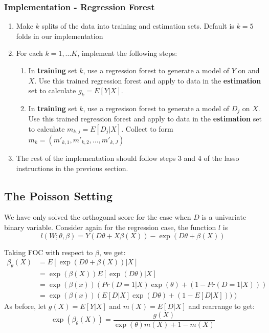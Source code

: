 \documentclass[11pt]{article}
\begin{document}
\subsubsection{Implementation - Regression Forest}
\begin{enumerate}
	\item Make $k$  splits of the data into training and estimation sets. Default is $k = 5$ folds in our implementation

	\item For each $k = 1, ... K$, implement the following steps:
  \begin{enumerate}
    \item In \textbf{training} set $k$, use a regression forest to generate a model of $Y$ on and $X$. Use this trained regression forest and apply to data in the \textbf{estimation} set to calculate $g_k = E[Y|X]$.
    \item In \textbf{training} set $k$, use a regresison forest to generate a model of $D_j$ on $X$. Use this trained regression forest and apply to data in the \textbf{estimation} set to calculate $m_{k, j} = E[D_j|X]$. Collect to form $m_k = (m'_{k,1}, m'_{k,2}, . . ., m'_{k, J})$
  \end{enumerate}
  \item The rest of the implementation should follow steps 3 and 4 of the lasso instructions in the previous section.
\end{enumerate}

\subsection{The Poisson Setting}
We have only solved the orthogonal score for the case when $D$ is a univariate binary variable. Consider again for the regression case, the function $l$ is
\begin{equation*}
	l(W; \theta, \beta) = Y(D\theta + X\beta(X)) - \exp(D\theta + \beta(X))
\end{equation*}

\noindent Taking FOC with respect to $\beta$, we get:
\begin{align*}
	\beta_\theta(X) &= E[\exp(D\theta + \beta(X)) | X] \\
  &= \exp(\beta(X)) E[\exp(D\theta)|X] \\
  &= \exp(\beta(x)) \left(Pr(D = 1 | X)\exp(\theta) + (1 - Pr(D = 1 | X))\right) \\
	&= \exp(\beta(x)) \left(E[D | X]\exp(D\theta) + (1-E[D|X]))\right)
\end{align*}
As before, let $g(X) = E[Y|X]$ and $m(X) = E[D|X]$ and rearrange to get:
$$\exp \left(\beta_{\theta}(X)\right)=\frac{g(X)}{\exp (\theta) m(X)+1-m(X)}$$
\end{document}
